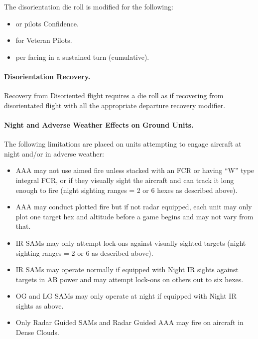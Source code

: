 \begin{advancedrules}
The disorientation die roll is modified for the following:
\begin{itemize}
    \item \plus{} or \minus{} pilots Confidence.
    \item {} for Veteran Pilots.
    \item {} per facing in a sustained turn (cumulative).
\end{itemize}

\paragraph{Disorientation Recovery.} Recovery from Disoriented flight requires a die roll as if recovering from disorientated flight with all the appropriate departure recovery modifier.

\paragraph{Night and Adverse Weather Effects on Ground Units.} The following limitations are placed on units attempting to engage aircraft at night and/or in adverse weather:

\begin{itemize}

    \item AAA may not use aimed fire unless stacked with an FCR or having “W” type integral FCR, or if they visually sight the aircraft and can track it long enough to fire (night sighting ranges = 2 or 6 hexes as described above).

    \item AAA may conduct plotted fire but if not radar equipped, each unit may only plot one target hex and altitude before a game begins and may not vary from that.

    \item IR SAMs may only attempt lock-ons against visually sighted targets (night sighting ranges = 2 or 6 as described above).

    \item IR SAMs may operate normally if equipped with Night IR sights against targets in AB power and may attempt lock-ons on others out to six hexes.

    \item OG and LG SAMs may only operate at night if equipped with Night IR sights as above.

    \item Only Radar Guided SAMs and Radar Guided AAA may fire on aircraft in Dense Clouds.


\end{itemize}
\end{advancedrules}
